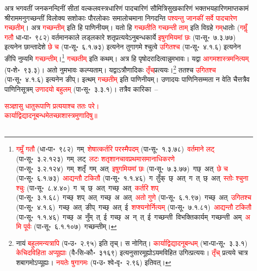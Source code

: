 \begin{sloppypar}\justifying\noindent\hspace{10mm} अत्र भगवतीं जनक\-नन्दिनीं सीतां वल्कल\-वस्त्र\-धारिणं पाद\-चारिणं सौमित्रि\-सुख\-कारिणं भक्त\-भय\-हारिणमाप्त\-कामं श्रीराममनुगच्छन्तीं विलोक्य सशोकाः पौर\-लोकाः समालोचमाना निगदन्ति \textcolor{red}{पश्यन्तु जानकीं सर्वे पाद\-चारेण गच्छतीम्}। अत्र \textcolor{red}{गच्छन्तीम्} इति हि पाणिनीयम्। यतो हि \textcolor{red}{गच्छतीति गच्छन्ती ताम्} इति विग्रहे \textcolor{red}{गम्‌}\-धातोः (\textcolor{red}{गमॢँ गतौ} धा॰पा॰~९८२) वर्तमान\-काले लड्लकारे शतृ\-प्रत्ययेऽनुबन्ध\-कार्ये \textcolor{red}{इषुगमियमां छः} (पा॰सू॰~७.३.७७) इत्यनेन छान्तादेशे \textcolor{red}{छे च} (पा॰सू॰~६.१.७३) इत्यनेन तुगागमे श्चुत्वे \textcolor{red}{उगितश्च} (पा॰सू॰~४.१.६) इत्यनेन ङीपि नुम्यमि \textcolor{red}{गच्छन्तीम्}।\footnote{\textcolor{red}{गमॢँ गतौ} (धा॰पा॰~९८२)~\arrow गम्~\arrow \textcolor{red}{शेषात्कर्तरि परस्मैपदम्} (पा॰सू॰~१.३.७८)~\arrow \textcolor{red}{वर्तमाने लट्} (पा॰सू॰~३.२.१२३)~\arrow गम्~लट्~\arrow \textcolor{red}{लटः शतृशानचावप्रथमा\-समानाधिकरणे} (पा॰सू॰~३.२.१२४)~\arrow गम्~शतृँ~\arrow गम्~अत्~\arrow \textcolor{red}{इषुगमियमां छः} (पा॰सू॰~७.३.७७)~\arrow गछ्~अत्~\arrow \textcolor{red}{छे च} (पा॰सू॰~६.१.७३)~\arrow \textcolor{red}{आद्यन्तौ टकितौ} (पा॰सू॰~१.१.४६)~\arrow ग~तुँक्~छ्~अत्~\arrow ग~त्~छ्~अत्~\arrow \textcolor{red}{स्तोः श्चुना श्चुः} (पा॰सू॰~८.४.४०)~\arrow ग~च्~छ्~अत्~\arrow गच्छ्~अत्~\arrow \textcolor{red}{कर्तरि शप्‌} (पा॰सू॰~३.१.६८)~\arrow गच्छ्~शप्~अत्~\arrow गच्छ्~अ~अत्~\arrow \textcolor{red}{अतो गुणे} (पा॰सू॰~६.१.९७)~\arrow गच्छ्~अत्~\arrow \textcolor{red}{उगितश्च} (पा॰सू॰~४.१.६)~\arrow गच्छ्~अत्~ङीप्~\arrow गच्छ्~अत्~ई~\arrow \textcolor{red}{शप्श्यनोर्नित्यम्} (पा॰सू॰~७.१.८१)~\arrow \textcolor{red}{आद्यन्तौ टकितौ} (पा॰सू॰~१.१.४६)~\arrow गच्छ्~अ~नुँम्~त्~ई~\arrow गच्छ्~अ~न्~त्~ई~\arrow गच्छन्ती~\arrow विभक्ति\-कार्यम्~\arrow गच्छन्ती~अम्~\arrow \textcolor{red}{अमि पूर्वः} (पा॰सू॰~६.१.१०७)~\arrow गच्छन्तीम्।} \textcolor{red}{गच्छतीम्} इति कथम्। अत्र हि पृषोदरादित्वान्नुमभावः। यद्वा \textcolor{red}{आगम\-शास्त्रमनित्यम्} (प॰शे॰~९३.३)। अतो नुमभावः कल्प्यताम्। यद्वाऽत्रौणादिकः \textcolor{red}{तृँच्‌}\-प्रत्ययः।\footnote{नायं \textcolor{red}{बहुलमन्यत्रापि} (प॰उ॰~२.९५) इति तृच्। स नोगित्। \textcolor{red}{कार्याद्विद्यादनूबन्धम्} (भा॰पा॰सू॰~३.३.१) \textcolor{red}{केचिदविहिता अप्यूह्याः} (वै॰सि॰कौ॰~३१६९) इत्यनुसारमूह्योऽ\-यमविहित उगित्प्रत्ययः। \textcolor{red}{तृँच्} प्रत्यये चात्र शबागमोऽप्यूह्यः। \textcolor{red}{नयतेः षुगागमः} (प॰उ॰ श्वे॰वृ॰~२.९६) इतिवत्।} ततश्च \textcolor{red}{उगितश्च} (पा॰सू॰~४.१.६) इत्यनेन ङीप्। इत्थम् \textcolor{red}{गच्छतीम्} इति पाणिनीयम्। उणादयः पाणिनि\-सम्मता न वेति चैत्तत्रैव पाणिनि\-सूत्रम् \textcolor{red}{उणादयो बहुलम्} (पा॰सू॰~३.३.१)। तत्रैव कारिका~–\end{sloppypar}
\centering\textcolor{red}{सञ्ज्ञासु धातुरूपाणि प्रत्ययाश्च ततः परे।\nopagebreak\\
कार्याद्विद्यादनूबन्धमेतच्छाशास्त्रमुणादिषु॥}\nopagebreak\\
 \\
